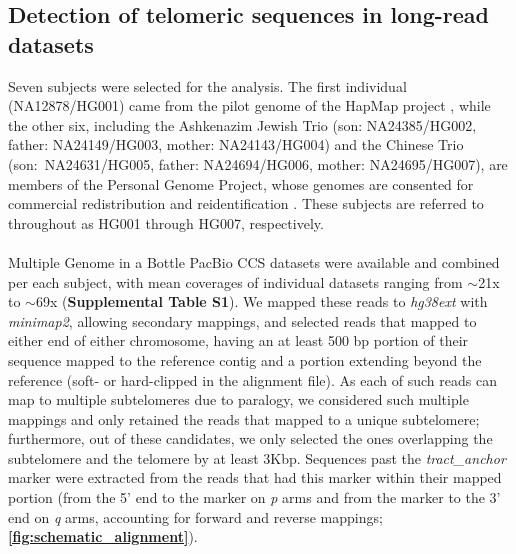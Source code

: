 \documentclass{article}
\begin{document}
\subsection*{Detection of telomeric sequences in long-read datasets}
    Seven subjects were selected for the analysis.
    The first individual (NA12878/HG001) came from the pilot genome of the HapMap project \parencite{HG001},
    while the other six,
        including
            the Ashkenazim Jewish Trio (son: NA24385/HG002, father: NA24149/HG003, mother: NA24143/HG004)
            and the Chinese Trio \\%
            (\mbox{son: NA24631/HG005}, father: NA24694/HG006, mother: NA24695/HG007),
        are members of the Personal Genome Project,
            whose genomes are consented for commercial redistribution and reidentification \parencite{HG00X}.
    These subjects are referred to throughout as HG001 through HG007, respectively.
    \\~\\
    Multiple Genome in a Bottle \parencite{giab} PacBio CCS \parencite{pacbio,pacbioccs} datasets were available and combined per each subject,
        with mean coverages of individual datasets ranging from $\sim$21x to $\sim$69x (\textbf{Supplemental Table S1}).
    We mapped these reads to \textit{hg38ext} with \textit{minimap2}, allowing secondary mappings,
        and selected reads that mapped to either end of either chromosome,
        having an at least 500 bp portion of their sequence mapped to the reference contig and a portion extending beyond the reference
            (soft- or hard-clipped in the alignment file).
    As each of such reads can map to multiple subtelomeres due to paralogy,
        we considered such multiple mappings and only retained the reads that mapped to a unique subtelomere;
        furthermore, out of these candidates, we only selected the ones overlapping the subtelomere and the telomere by at least 3Kbp.
    Sequences past the \textit{tract\_anchor} marker were extracted from the reads that had this marker within their mapped portion
        (from the 5' end to the marker on \textit{p} arms and from the marker to the 3' end on \textit{q} arms,
        accounting for forward and reverse mappings; \textbf{\autoref{fig:schematic_alignment}}).
\end{document}
